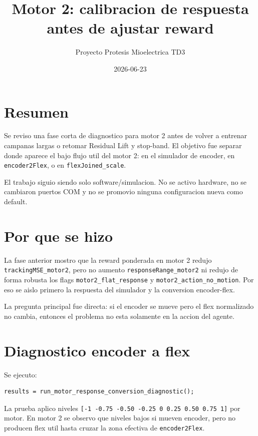 \documentclass[11pt]{article}
\title{Motor 2: calibracion de respuesta antes de ajustar reward}
\author{Proyecto Protesis Mioelectrica TD3}
\date{2026-06-23}
\begin{document}
\maketitle

\section{Resumen}

Se reviso una fase corta de diagnostico para motor 2 antes de volver a
entrenar campanas largas o retomar Residual Lift y stop-band. El objetivo
fue separar donde aparece el bajo flujo util del motor 2: en el simulador
de encoder, en \texttt{encoder2Flex}, o en \texttt{flexJoined\_scale}.

El trabajo siguio siendo solo software/simulacion. No se activo hardware,
no se cambiaron puertos COM y no se promovio ninguna configuracion nueva
como default.

\section{Por que se hizo}

La fase anterior mostro que la reward ponderada en motor 2 redujo
\texttt{trackingMSE\_motor2}, pero no aumento \texttt{responseRange\_motor2}
ni redujo de forma robusta los flags \texttt{motor2\_flat\_response} y
\texttt{motor2\_action\_no\_motion}. Por eso se aislo primero la respuesta
del simulador y la conversion encoder-flex.

La pregunta principal fue directa: si el encoder se mueve pero el flex
normalizado no cambia, entonces el problema no esta solamente en la accion
del agente.

\section{Diagnostico encoder a flex}

Se ejecuto:

\begin{verbatim}
results = run_motor_response_conversion_diagnostic();
\end{verbatim}

La prueba aplico niveles \texttt{[-1 -0.75 -0.50 -0.25 0 0.25 0.50 0.75 1]}
por motor. En motor 2 se observo que niveles bajos si mueven encoder, pero
no producen flex util hasta cruzar la zona efectiva de \texttt{encoder2Flex}.
\end{document}
